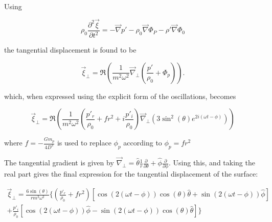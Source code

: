 \documentclass[11pt]{amsart}
\begin{document}
Using

\begin{equation} \label{eq:mom_lin}
\rho_{0} \frac{\partial^{2} \vec{\xi}}{\partial t^{2}} = - \vec{\nabla} p' - \rho_{0} \vec{\nabla} \Phi_{P}
- \rho' \vec{\nabla} \Phi_{0}
\end{equation}

the tangential displacement is found to be

\begin{equation}
\vec{\xi}_{\perp} = \Re \left(   \frac{1}{m^{2} \omega^{2}}  \vec{\nabla}_{\perp}  \left(   \frac{p'}{\rho_{0}}  +  \Phi_{p}   \right) \right).
\end{equation}

which, when expressed using the explicit form of the oscillations, becomes

\begin{equation}
\vec{\xi}_{\perp} = \Re \left(   \frac{1}{m^{2} \omega^{2}}  \left(   \frac{p'_{r}}{\rho_{0}}  +  f r^{2} + i \frac{p'_{i}}{\rho_{0}}   \right)   \vec{\nabla}_{\perp}  \left(   3 \sin^{2}(\theta) e^{2 i ( \omega t - \phi)}   \right)  \right)
\end{equation}

where $f = - \frac{G m_{p}}{4 D^{3}}$ is used to replace $\phi_{p}$ according to $\phi_{p} = f r^{2}$

The tangential gradient is given by $\vec{\nabla}_{\perp} = \hat{\theta} \frac{1}{r} \frac{\partial}{\partial \theta} + \hat{\phi} \frac{\partial}{\partial \phi}$.  Using this, and taking the real part gives the final expression for the tangential displacement of the surface:

\begin{multline}
\vec{\xi}_{\perp} =    \frac{6 \sin(\theta)}{r m^{2} \omega^{2}}  \Bigg\{  \left(   \frac{p'_{r}}{\rho_{0}}  +  f r^{2} \right) \left[ \cos(2( \omega t - \phi )) \cos(\theta) \hat{\theta}  +  \sin(2( \omega t - \phi )) \hat{\phi} \right] \\
 + \frac{p'_{i}}{\rho_{0}}  \left[ \cos(2( \omega t - \phi )) \hat{\phi}  -  \sin(2( \omega t - \phi )) \cos(\theta) \hat{\theta} \right]    \Bigg\}
\end{multline}

















\end{document}
